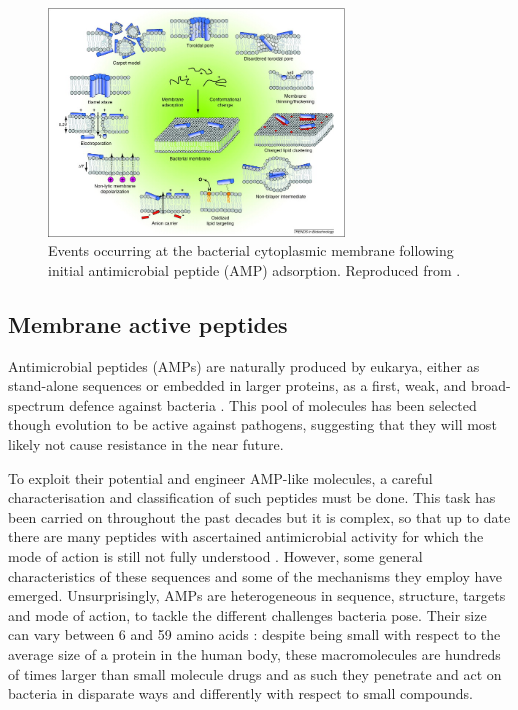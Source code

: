\begin{figure}
\begin{center}
\includegraphics[width = 0.7\textwidth]{1introduction/pics/amp_mech.jpg}
\caption[Antimicrobial peptides]{Events occurring at the bacterial cytoplasmic membrane following initial antimicrobial peptide (AMP) adsorption. Reproduced from \cite{Nguyen2011}.} \label{fig:amp}
\end{center}
\end{figure}


\subsection{Membrane active peptides} \label{sec:host-defense-peptides}
Antimicrobial peptides (AMPs) are naturally produced by eukarya, either as stand-alone sequences or embedded in larger proteins, as a first, weak, and broad-spectrum defence against bacteria \cite{Nguyen2011}.
%
This pool of molecules has been selected though evolution to be active against pathogens, suggesting that they will most likely not cause resistance in the near future.

To exploit their potential and engineer AMP-like molecules, a careful characterisation and classification of such peptides must be done. This task has been carried on throughout the past decades but it is complex, so that up to date there are many peptides with ascertained antimicrobial activity for which the mode of action is still not fully understood \cite{Ebbensgaard2015}. However, some general characteristics of these sequences and some of the mechanisms they employ have emerged.
%
Unsurprisingly, AMPs are heterogeneous in  sequence, structure, targets and mode of action, to tackle the different challenges bacteria pose. Their size can vary between 6 and 59 amino acids \cite{Brogden2005}: despite being small with respect to the average size of a protein in the human body, these macromolecules are hundreds of times larger than small molecule drugs and as such they penetrate and act on bacteria in disparate ways and differently with respect to small compounds.


